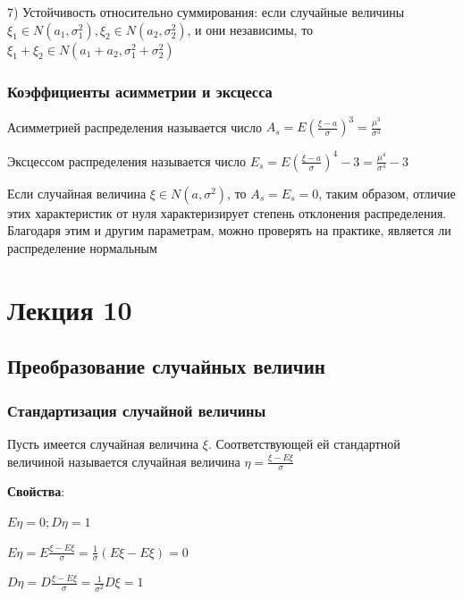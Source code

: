 \documentclass[12pt]{article}
\begin{document}
    7) Устойчивость относительно суммирования: если случайные величины $\xi_1 \in N(a_1, \sigma_1^2), \xi_2 \in N(a_2, \sigma_2^2)$, и они независимы, то $\xi_1 + \xi_2 \in N(a_1 + a_2, \sigma^2_1 + \sigma^2_2)$

    \subsubsection{Коэффициенты асимметрии и эксцесса}

     Асимметрией распределения называется число $A_s = E\left(\frac{\xi - a}{\sigma}\right)^3 = \frac{\mu^3}{\sigma^3}$

     Эксцессом распределения называется число $E_s = E\left(\frac{\xi - a}{\sigma}\right)^4 - 3 = \frac{\mu^4}{\sigma^4} - 3$

    \Notas Если случайная величина $\xi \in N(a, \sigma^2)$, то $A_s = E_s = 0$, таким образом, отличие этих характеристик от нуля характеризирует 
    степень отклонения распределения. Благодаря этим и другим параметрам, можно проверять на практике, является ли распределение нормальным 


    \section{Лекция 10}

    \subsection{Преобразование случайных величин}

    \subsubsection{Стандартизация случайной величины}

    \Def Пусть имеется случайная величина $\xi$. Соответствующей ей стандартной величиной называется
    случайная величина $\eta = \frac{\xi - E\xi}{\sigma}$

    \textbf{Свойства}:

    $E\eta = 0; D\eta = 1$

    \begin{MyProof}
        $E\eta = E \frac{\xi - E\xi}{\sigma} = \frac{1}{\sigma} (E\xi - E\xi) = 0$

        $D\eta = D \frac{\xi - E\xi}{\sigma} = \frac{1}{\sigma^2} D\xi = 1$
    \end{MyProof}
\end{document}
